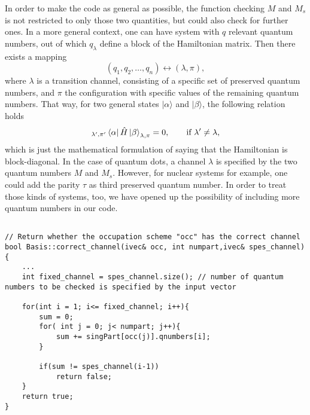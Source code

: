 In order to make the code as general as possible, the function checking $M$ and $M_s$ is not restricted to only those two quantities, but could also check for further ones. In a more general context, one can have system with $q$ relevant quantum numbers, out of which $q_{\lambda}$ define a block of the Hamiltonian matrix. Then there exists a mapping
\[
(q_1,q_2,\dots,q_n) \leftrightarrow (\lambda, \pi),
\]
where $\lambda$ is a transition channel, consisting of a specific set of preserved quantum numbers, and $\pi$ the configuration with specific values of the remaining quantum numbers. That way, for two general states $|\alpha\rangle$ and  $|\beta\rangle$, the following relation holds
\[
 _{\lambda', \pi'}\left\langle \alpha \right| \hat{H} \left| \beta \right\rangle_{\lambda,\pi} = 0, \qquad \mbox{if } \lambda' \neq \lambda,
\]
which is just the mathematical formulation of saying that the Hamiltonian is block-diagonal. In the case of quantum dots, a channel $\lambda$ is specified by the two quantum numbers $M$ and $M_s$. However, for nuclear systems for example, one could  add the parity $\tau$ as third preserved quantum number. In order to treat those kinds of systems, too, we have opened up the possibility of including more quantum numbers in our code.

\begin{lstlisting}[float, caption={Function to check if a Slater determinant fulfils the requirements of a specific channel. Input parameters are the vector \textit{occ}, containing the occupied sp-states, the number of particles \textit{numpart} and the vector \textit{spes\_channel}. This vector contains the values of the preserved quantum numbers in the same order as they appear in the array \textit{qnumbers} with the quantum numbers of each sp-state, starting with the second index. In our case, \textit{qnumbers} contains the quantum numbers $n,m,m_s$ and if we are interested in the channel with $M = M_s = 0$, the vector \textit{spes\_channel} therefore has to contain $(0,0)$. For other systems with more quantum numbers, one could simply extend the array \textit{qnumbers} and, if those quantum numbers define the channel, also the vector $spes\_channel$.},label=lst:channel]

// Return whether the occupation scheme "occ" has the correct channel
bool Basis::correct_channel(ivec& occ, int numpart,ivec& spes_channel) {
    ...
    int fixed_channel = spes_channel.size(); // number of quantum numbers to be checked is specified by the input vector
      
    for(int i = 1; i<= fixed_channel; i++){
        sum = 0;
        for( int j = 0; j< numpart; j++){       
            sum += singPart[occ(j)].qnumbers[i];
        }
              
        if(sum != spes_channel(i-1))
            return false;       
    }
    return true;
}
\end{lstlisting}

